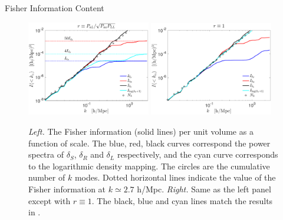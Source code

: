 \begin{section}{Fisher Information Content}
  \begin{figure}
    \includegraphics[width=0.48\textwidth]{fig4a.pdf}
    \includegraphics[width=0.48\textwidth]{fig4b.pdf}
    \centering
    \caption{{\it Left.} The Fisher information (solid lines) per unit volume as
      a function of scale.  The blue, red, black curves correspond the power spectra
      of $\delta_S$, $\delta_R$ and $\delta_L$ respectively,
      and the cyan curve
      corresponds to the logarithmic density mapping. The circles
      are the cumulative number of $k$ modes.  Dotted horizontal lines indicate the value of the 
      Fisher information at $k \simeq 2.7$ h/Mpc.  {\it Right.} Same
      as the left panel except with $r\equiv 1$. The black, blue and cyan lines
      match the results in \cite{bib:Rimes2006,bib:Mark2009}.}
  \label{fig:fisherinfo}
\end{figure}
\end{section}
